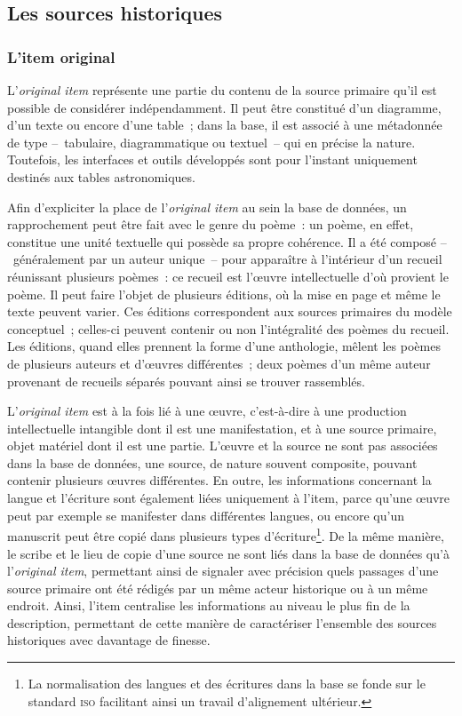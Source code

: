 \documentclass[a4paper,12pt,twoside]{book}
\newcommand{\eng}{\emph}
\newcommand{\oi}{\eng{original item}\xspace}
\begin{document}
		\subsection{Les sources historiques}
			\subsubsection{L'item original}
L'\oi représente une partie du contenu de la source primaire qu'il est possible de considérer indépendamment. Il peut être constitué d'un diagramme, d'un texte ou encore d'une table~; dans la base, il est associé à une métadonnée de type –~tabulaire, diagrammatique ou textuel~– qui en précise la nature. Toutefois, les interfaces et outils développés sont pour l'instant uniquement destinés aux tables astronomiques.

Afin d'expliciter la place de l'\oi au sein la base de données, un rapprochement peut être fait avec le genre du poème~: un poème, en effet, constitue une unité textuelle qui possède sa propre cohérence. Il a été composé –~généralement par un auteur unique~– pour apparaître à l'intérieur d'un recueil réunissant plusieurs poèmes~: ce recueil est l'œuvre intellectuelle d'où provient le poème. Il peut faire l'objet de plusieurs éditions, où la mise en page et même le texte peuvent varier. Ces éditions correspondent aux sources primaires du modèle conceptuel~; celles-ci peuvent contenir ou non l'intégralité des poèmes du recueil. Les éditions, quand elles prennent la forme d'une anthologie, mêlent les poèmes de plusieurs auteurs et d'œuvres différentes~; deux poèmes d'un même auteur provenant de recueils séparés pouvant ainsi se trouver rassemblés.

L'\oi est à la fois lié à une œuvre, c'est-à-dire à une production intellectuelle intangible dont il est une manifestation, et à une source primaire, objet matériel dont il est une partie. L'œuvre et la source ne sont pas associées dans la base de données, une source, de nature souvent composite, pouvant contenir plusieurs œuvres différentes. En outre, les informations concernant la langue et l'écriture sont également liées uniquement à l'item, parce qu'une œuvre peut par exemple se manifester dans différentes langues, ou encore qu'un manuscrit peut être copié dans plusieurs types d'écriture\footnote{La normalisation des langues et des écritures dans la base se fonde sur le standard \textsc{iso} facilitant ainsi un travail d'alignement ultérieur.}. De la même manière, le scribe et le lieu de copie d'une source ne sont liés dans la base de données qu'à l'\oi, permettant ainsi de signaler avec précision quels passages d'une source primaire ont été rédigés par un même acteur historique ou à un même endroit. Ainsi, l'item centralise les informations au niveau le plus fin de la description, permettant de cette manière de caractériser l'ensemble des sources historiques avec davantage de finesse.
\end{document}
